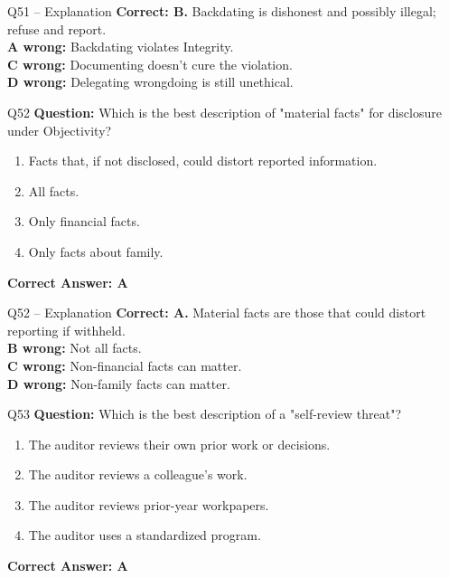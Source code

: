 \documentclass[aspectratio=169,10pt]{beamer}
\begin{document}
	\begin{frame}[t]{Q51 -- Explanation}
		\small
		\textbf{Correct: B.} Backdating is dishonest and possibly illegal; refuse and report. \\[4pt]
		\textbf{A wrong:} Backdating violates Integrity. \\[2pt]
		\textbf{C wrong:} Documenting doesn't cure the violation. \\[2pt]
		\textbf{D wrong:} Delegating wrongdoing is still unethical.
	\end{frame}
	
	\begin{frame}[t]{Q52}
		\small
		\textbf{Question:} Which is the best description of "material facts" for disclosure under Objectivity?
		\begin{enumerate}[label=\Alph*.,itemsep=1pt,topsep=2pt]
			\item Facts that, if not disclosed, could distort reported information.
			\item All facts.
			\item Only financial facts.
			\item Only facts about family.
		\end{enumerate}
		\vspace{4pt}
		\textbf{Correct Answer: A}
	\end{frame}
	
	\begin{frame}[t]{Q52 -- Explanation}
		\small
		\textbf{Correct: A.} Material facts are those that could distort reporting if withheld. \\[4pt]
		\textbf{B wrong:} Not all facts. \\[2pt]
		\textbf{C wrong:} Non-financial facts can matter. \\[2pt]
		\textbf{D wrong:} Non-family facts can matter.
	\end{frame}
	
	\begin{frame}[t]{Q53}
		\small
		\textbf{Question:} Which is the best description of a "self-review threat"?
		\begin{enumerate}[label=\Alph*.,itemsep=1pt,topsep=2pt]
			\item The auditor reviews their own prior work or decisions.
			\item The auditor reviews a colleague's work.
			\item The auditor reviews prior-year workpapers.
			\item The auditor uses a standardized program.
		\end{enumerate}
		\vspace{4pt}
		\textbf{Correct Answer: A}
	\end{frame}
	
\end{document}

